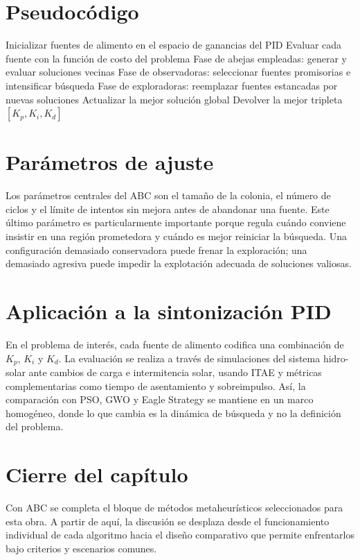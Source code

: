 \section{Pseudocódigo}
\begin{algorithm}[H]
\caption{Esquema general del ABC para sintonización PID}
\begin{algorithmic}[1]
\State Inicializar fuentes de alimento en el espacio de ganancias del PID
\State Evaluar cada fuente con la función de costo del problema
    \State Fase de abejas empleadas: generar y evaluar soluciones vecinas
    \State Fase de observadoras: seleccionar fuentes promisorias e intensificar búsqueda
    \State Fase de exploradoras: reemplazar fuentes estancadas por nuevas soluciones
    \State Actualizar la mejor solución global
\EndWhile
\State Devolver la mejor tripleta $\left[K_p,K_i,K_d\right]$
\end{algorithmic}
\end{algorithm}

\section{Parámetros de ajuste}
Los parámetros centrales del ABC son el tamaño de la colonia, el número de ciclos y el límite
de intentos sin mejora antes de abandonar una fuente. Este último parámetro es particularmente
importante porque regula cuándo conviene insistir en una región prometedora y cuándo es mejor
reiniciar la búsqueda. Una configuración demasiado conservadora puede frenar la exploración;
una demasiado agresiva puede impedir la explotación adecuada de soluciones valiosas.

\section{Aplicación a la sintonización PID}
En el problema de interés, cada fuente de alimento codifica una combinación de $K_p$, $K_i$ y
$K_d$. La evaluación se realiza a través de simulaciones del sistema hidro-solar ante cambios
de carga e intermitencia solar, usando ITAE y métricas complementarias como tiempo de
asentamiento y sobreimpulso. Así, la comparación con PSO, GWO y Eagle Strategy se mantiene
en un marco homogéneo, donde lo que cambia es la dinámica de búsqueda y no la definición
del problema.

\section{Cierre del capítulo}
Con ABC se completa el bloque de métodos metaheurísticos seleccionados para esta obra. A
partir de aquí, la discusión se desplaza desde el funcionamiento individual de cada algoritmo
hacia el diseño comparativo que permite enfrentarlos bajo criterios y escenarios comunes.
